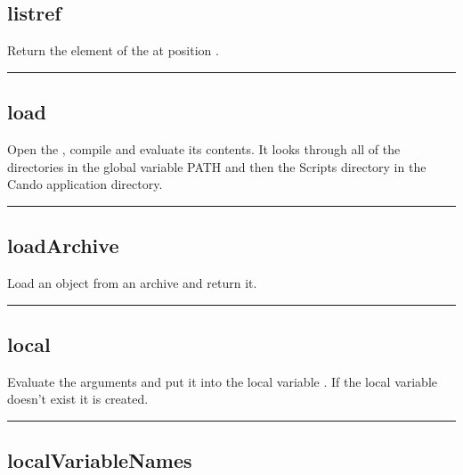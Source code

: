 \begin{itemize}
\subsection{listref}

  Return the element of the  at position .

\rule{6in}{0.01cm}\par
{}\par
\subsection{load}

  Open the , compile and evaluate its contents.
  It looks through all of the directories in the global variable PATH and then 
  the Scripts directory in the Cando application directory.


\rule{6in}{0.01cm}\par
{}\par
\subsection{loadArchive}

Load an object from an archive and return it.


\rule{6in}{0.01cm}\par
{}\par
\subsection{local}
  \par

  Evaluate the arguments and put it into the local variable . If the local variable doesn't exist it is created.

\rule{6in}{0.01cm}\par
{}\par
\subsection{localVariableNames}


\end{itemize}
